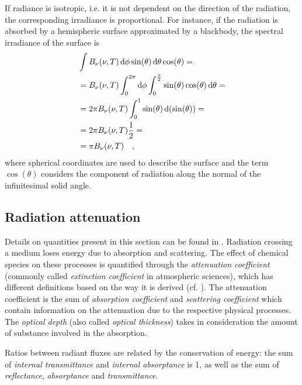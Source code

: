 \documentclass[a4paper,10pt,twocolumn,\classoptions]{article}
\begin{document}
If radiance is isotropic, i.e. it is not dependent on the direction of the radiation, the corresponding irradiance is proportional. For instance, if the radiation is absorbed by a hemispheric surface approximated by a blackbody, the spectral irradiance of the surface is
\begin{equation}
  \label{eq:spectral_irradiance_blackbody_hemisphere}
  \begin{split}
    & \int B_\nu (\nu, T) \odif{\phi} \sin(\theta) \odif{\theta} \cos(\theta) = \\
    & = B_\nu (\nu, T) \int_0^{2\pi} \odif{\phi} \int_0^\frac{\pi}{2} \sin(\theta) \cos(\theta) \odif{\theta} = \\
    & = 2 \pi B_\nu (\nu, T) \int_0^1 \sin(\theta) \odif{(\sin(\theta))} = \\
    & = 2 \pi B_\nu (\nu, T) \frac{1}{2} = \\
    & = \pi B_\nu (\nu, T)
    \quad ,
  \end{split}
\end{equation}
where spherical coordinates are used to describe the surface and the term $\cos(\theta)$ considers the component of radiation along the normal of the infinitesimal solid angle.



\subsection{Radiation attenuation}
\label{sec:Radiation attenuation}
Details on quantities present in this section can be found in \cite[285]{Modest}.
Radiation crossing a medium loses energy due to absorption and scattering. The effect of chemical species on these processes is quantified through the \emph{attenuation coefficient} (commonly called \emph{extinction coefficient} in atmospheric sciences), which has different definitions based on the way it is derived (cf. \cite[44]{Catling}). The attenuation coefficient is the sum of \emph{absorption coefficient} and \emph{scattering coefficient} which contain information on the attenuation due to the respective physical processes. The \emph{optical depth} (also called \emph{optical thickness}) takes in consideration the amount of substance involved in the absorption.

Ratios between radiant fluxes are related by the conservation of energy: the sum of \emph{internal transmittance} and \emph{internal absorptance} is 1, as well as the sum of \emph{reflectance}, \emph{absorptance} and \emph{transmittance}.
\end{document}
